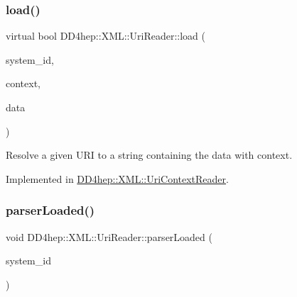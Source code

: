 \hypertarget{class_d_d4hep_1_1_x_m_l_1_1_uri_reader_a80a35ded7f30ba3b1954edb0e0493d6f}{}\label{class_d_d4hep_1_1_x_m_l_1_1_uri_reader_a80a35ded7f30ba3b1954edb0e0493d6f} 
\subsubsection{\texorpdfstring{load()}{load()}\hspace{0.1cm}{\footnotesize\ttfamily [2/2]}}
{\footnotesize\ttfamily virtual bool D\+D4hep\+::\+X\+M\+L\+::\+Uri\+Reader\+::load (\begin{DoxyParamCaption}\item[{const std\+::string \&}]{system\+\_\+id,  }\item[{\hyperlink{struct_d_d4hep_1_1_x_m_l_1_1_uri_reader_1_1_user_context}{User\+Context} $\ast$}]{context,  }\item[{std\+::string \&}]{data }\end{DoxyParamCaption})\hspace{0.3cm}{\ttfamily [pure virtual]}}



Resolve a given U\+RI to a string containing the data with context. 



Implemented in \hyperlink{class_d_d4hep_1_1_x_m_l_1_1_uri_context_reader_a4a092a836c08154d7d787f9244701944}{D\+D4hep\+::\+X\+M\+L\+::\+Uri\+Context\+Reader}.

\hypertarget{class_d_d4hep_1_1_x_m_l_1_1_uri_reader_a58d5ece4bc5ee3b5d1d8f9eac85baecd}{}\label{class_d_d4hep_1_1_x_m_l_1_1_uri_reader_a58d5ece4bc5ee3b5d1d8f9eac85baecd} 
\subsubsection{\texorpdfstring{parser\+Loaded()}{parserLoaded()}\hspace{0.1cm}{\footnotesize\ttfamily [1/2]}}
{\footnotesize\ttfamily void D\+D4hep\+::\+X\+M\+L\+::\+Uri\+Reader\+::parser\+Loaded (\begin{DoxyParamCaption}\item[{const std\+::string \&}]{system\+\_\+id }\end{DoxyParamCaption})\hspace{0.3cm}{\ttfamily [virtual]}}



